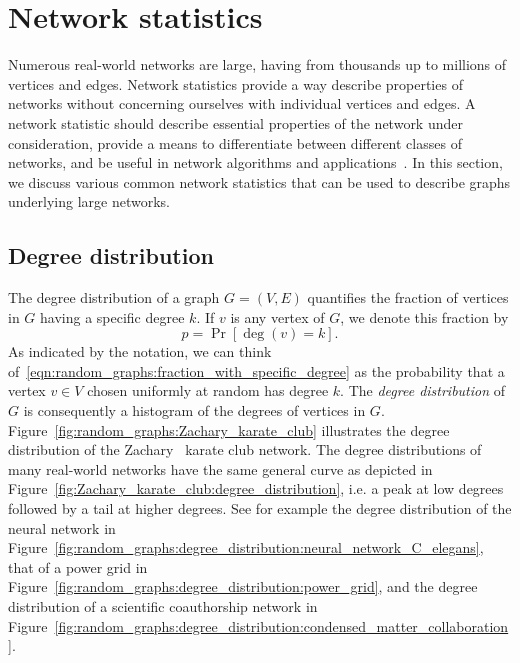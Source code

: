 \section{Network statistics}

Numerous real-world networks are large, having from thousands up to
millions of vertices and edges. Network statistics provide a way
describe properties of networks without concerning ourselves with
individual vertices and edges. A network statistic should describe
essential properties of the network under consideration, provide a
means to differentiate between different classes of networks, and be
useful in network algorithms and
applications~\cite{BrinkmeierSchank2005}. In this section, we discuss
various common network statistics that can be used to describe graphs
underlying large networks.



\subsection{Degree distribution}

The degree distribution of a graph $G = (V,E)$ quantifies the fraction
of vertices in $G$ having a specific degree $k$. If $v$ is any vertex
of $G$, we denote this fraction by
\begin{equation}
\label{eqn:random_graphs:fraction_with_specific_degree}
p = \Pr[\deg(v) = k].
\end{equation}
As indicated by the notation, we can think
of~\eqref{eqn:random_graphs:fraction_with_specific_degree} as the
probability that a vertex $v \in V$ chosen uniformly at random has
degree $k$. The \emph{degree distribution}
of $G$ is consequently a histogram of the degrees of vertices in
$G$. Figure~\ref{fig:random_graphs:Zachary_karate_club} illustrates
the degree distribution of the
Zachary~\cite{Zachary1977} karate
club network. The degree distributions of many real-world networks
have the same general curve as depicted in
Figure~\ref{fig:Zachary_karate_club:degree_distribution}, i.e. a peak
at low degrees followed by a tail at higher degrees. See for example
the degree distribution of the neural network in
Figure~\ref{fig:random_graphs:degree_distribution:neural_network_C_elegans},
that of a power grid in
Figure~\ref{fig:random_graphs:degree_distribution:power_grid}, and the
degree distribution of a scientific coauthorship network in
Figure~\ref{fig:random_graphs:degree_distribution:condensed_matter_collaboration}.

